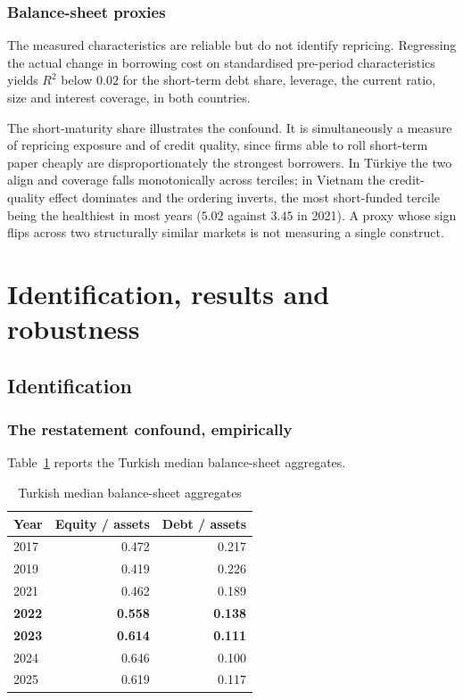 \documentclass[review,12pt,authoryear]{elsarticle}
\theoremstyle{plain}
\theoremstyle{definition}
\begin{document}
\subsubsection{Balance-sheet proxies}

The measured characteristics are reliable but do not identify repricing.
Regressing the actual change in borrowing cost on standardised pre-period
characteristics yields $R^2$ below $0.02$ for the short-term debt share,
leverage, the current ratio, size and interest coverage, in both countries.

The short-maturity share illustrates the confound. It is simultaneously a
measure of repricing exposure and of credit quality, since firms able to roll
short-term paper cheaply are disproportionately the strongest borrowers. In
T\"{u}rkiye the two align and coverage falls monotonically across terciles; in
Vietnam the credit-quality effect dominates and the ordering inverts, the
most short-funded tercile being the healthiest in most years ($5.02$ against
$3.45$ in 2021). A proxy whose sign flips across two structurally similar
markets is not measuring a single construct.

\section{Identification, results and robustness}
\label{sec:results}

\subsection{Identification}
\label{sec:ident}


\subsubsection{The restatement confound, empirically}

Table~\ref{tab:restate} reports the Turkish median balance-sheet aggregates.

\begin{table}[htbp]
\centering
\caption{Turkish median balance-sheet aggregates}
\label{tab:restate}
\begin{tabular}{lrr}
\toprule
Year & Equity / assets & Debt / assets \\
\midrule
2017 & 0.472 & 0.217 \\
2019 & 0.419 & 0.226 \\
2021 & 0.462 & 0.189 \\
\textbf{2022} & \textbf{0.558} & \textbf{0.138} \\
\textbf{2023} & \textbf{0.614} & \textbf{0.111} \\
2024 & 0.646 & 0.100 \\
2025 & 0.619 & 0.117 \\
\bottomrule
\end{tabular}
\end{table}
\end{document}
